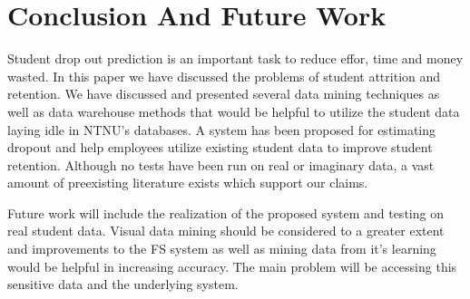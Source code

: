 \chapter{Conclusion And Future Work}
Student drop out prediction is an important task to reduce effor, time and money wasted.
In this paper we have discussed the problems of student attrition and retention.
We have discussed and presented several data mining techniques as well as data warehouse methods that would be helpful to utilize the student data laying idle in NTNU's databases.
A system has been proposed for estimating dropout and help employees utilize existing student data to improve student retention.
Although no tests have been run on real or imaginary data, a vast amount of preexisting literature exists which support our claims.

\bigskip\noindent
Future work will include the realization of the proposed system and testing on real student data.
Visual data mining should be considered to a greater extent and improvements to the FS system as well as mining data from it's learning would be helpful in increasing accuracy.
The main problem will be accessing this sensitive data and the underlying system.